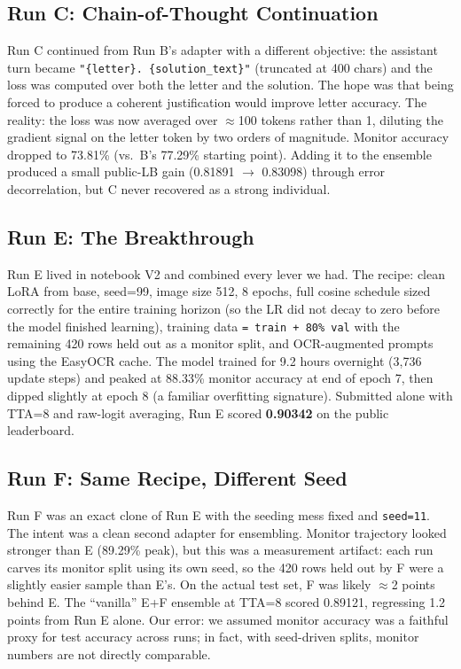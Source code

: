 \documentclass[11pt]{article}
\begin{document}
\subsection{Run C: Chain-of-Thought Continuation}
Run C continued from Run B's adapter with a different objective: the assistant turn became \texttt{"\{letter\}. \{solution\_text\}"} (truncated at 400 chars) and the loss was computed over both the letter and the solution. The hope was that being forced to produce a coherent justification would improve letter accuracy. The reality: the loss was now averaged over $\approx$100 tokens rather than 1, diluting the gradient signal on the letter token by two orders of magnitude. Monitor accuracy dropped to 73.81\% (vs.\ B's 77.29\% starting point). Adding it to the ensemble produced a small public-LB gain (0.81891 $\to$ 0.83098) through error decorrelation, but C never recovered as a strong individual.

\subsection{Run E: The Breakthrough}
Run E lived in notebook V2 and combined every lever we had. The recipe: clean LoRA from base, seed=99, image size 512, 8 epochs, full cosine schedule sized correctly for the entire training horizon (so the LR did not decay to zero before the model finished learning), training data \texttt{= train + 80\% val} with the remaining 420 rows held out as a monitor split, and OCR-augmented prompts using the EasyOCR cache. The model trained for 9.2 hours overnight (3{,}736 update steps) and peaked at 88.33\% monitor accuracy at end of epoch 7, then dipped slightly at epoch 8 (a familiar overfitting signature). Submitted alone with TTA=8 and raw-logit averaging, Run E scored \textbf{0.90342} on the public leaderboard.

\subsection{Run F: Same Recipe, Different Seed}
Run F was an exact clone of Run E with the seeding mess fixed and \texttt{seed=11}. The intent was a clean second adapter for ensembling. Monitor trajectory looked stronger than E (89.29\% peak), but this was a measurement artifact: each run carves its monitor split using its own seed, so the 420 rows held out by F were a slightly easier sample than E's. On the actual test set, F was likely $\approx$2 points behind E. The ``vanilla'' E+F ensemble at TTA=8 scored 0.89121, regressing 1.2 points from Run E alone. Our error: we assumed monitor accuracy was a faithful proxy for test accuracy across runs; in fact, with seed-driven splits, monitor numbers are not directly comparable.
\end{document}
